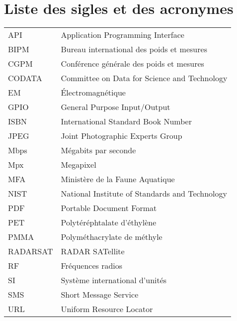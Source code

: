 
%
%

\chapter{Liste des sigles et des acronymes}


\begin{flushleft}
   \begin{tabular}{@{}ll}
      API & Application Programming Interface \\
      BIPM & Bureau international des poids et mesures\\
      CGPM & Conférence générale des poids et mesures\\
      CODATA & Committee on Data for Science and Technology\\
      EM & Électromagnétique\\
      GPIO & General Purpose Input/Output \\
      ISBN & International Standard Book Number\\
      JPEG & Joint Photographic Experts Group\\
      Mbps & Mégabits par seconde \\
      Mpx & Megapixel \\
      MFA & Ministère de la Faune Aquatique \\
      NIST & National Institute of Standards and Technology \\
      PDF & Portable Document Format \\
      PET & Polytéréphtalate d'éthylène \\
      PMMA & Polyméthacrylate de méthyle \\
      RADARSAT & RADAR SATellite\\
      RF & Fréquences radios\\
      SI & Système international d'unités \\
      SMS & Short Message Service \\
      URL & Uniform Resource Locator \\
   \end{tabular}
\end{flushleft}






